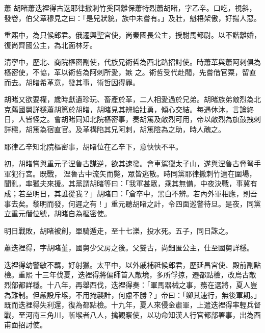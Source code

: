 
\begin{pinyinscope}

 蕭
 胡睹蕭迭裡得古迭耶律撒刺竹奚回離保蕭特烈蕭胡睹，字乙辛。口吃，視斜，發卷，伯父章穆見之曰：「是兒狀貌，族中未嘗有。」及壯，魁梧架傲，好揚人惡。



 重熙中，為只候郎君。俄遷興聖宮使，尚秦國長公主，授駙馬都尉。以不諧離婚，復尚齊國公主，為北面林牙。



 清寧中，歷北、商院樞密副使，代族兄術哲為西北路招討使。時蕭革與蕭阿刺俱為樞密使，不協，革以術哲為阿刺所愛，嫉
 之。術哲受代赴閥，先嘗借官粟，留直而去。胡睹希革意，發其事，術哲因得罪。



 胡睹又欲要權，歲時獻遺珍玩、畜產於革，二人相愛過於兄弟。胡睹族弟敵烈為北克薦國舅詳穩蕭胡篤於胡睹，胡睹見其辨給壯勇，傾心交結。每遇休沐，言論終日，人皆怪之。會胡睹同知北院樞密事，奏胡篤及敵烈可用，帝以敵烈為旗鼓拽刺詳穩，胡篤為宿直官。及革構陷其兄阿刺，胡篤陰為之助，時人醜之。



 耶律乙辛知北院樞密事，胡睹位在乙辛下，意怏怏不平。



 初，胡睹嘗與重元子涅魯古謀逆，欲其速發。會車駕獵太子山，遂與涅魯古脅弩手軍犯行宮。既戰，
 涅魯古中流矢而斃，眾皆逃散。時同黨耶律撒刺竹適在圍場，聞亂，率獵夫來援。其黨謂胡睹等曰：「我軍甚眾，乘其無備，中夜決戰，事冀有成；若至明日，其誰從我？」胡睹曰：「倉卒中，黑白不辨。若內外軍相應，則吾事去矣。黎明而發，何遲之有！」重元聽胡睹之計，令四面巡警待旦。是夜，同黨立重元僭位號，胡睹自為樞密使。



 明日戰敗，胡睹被創，單騎遁走，至十七濼，投水死。五子，同日誅之。



 蕭迭裡得，字胡睹堇，國舅少父房之後。父雙古，尚鈿匿公主，仕至國舅詳穩。



 迭裡得幼警敏不羈，好射獵。太平中，以外戚補祗候郎君，歷延昌宮使、殿前副點檢。重熙
 十三年伐夏，迭裡得將偏師首入敵境，多所俘掠，遷都點檢，改烏古敵烈部都詳穩。十八年，再舉西伐，迭裡得奏：「軍馬器械之事，務在選將，夏人豈為難制。但嚴設斥堠，不用掩襲計，何慮不勝？」帝曰：「卿其速行，無後軍期。」既而迭裡得失利還，復為都點檢。十九年，夏人來侵金肅軍，上遣迭裡得率輕兵督戰，至河南三角川，斬堠者八人，擒觀察使，以功命知漢人行官都部署事，出為酉甫面招討使。




\end{pinyinscope}
